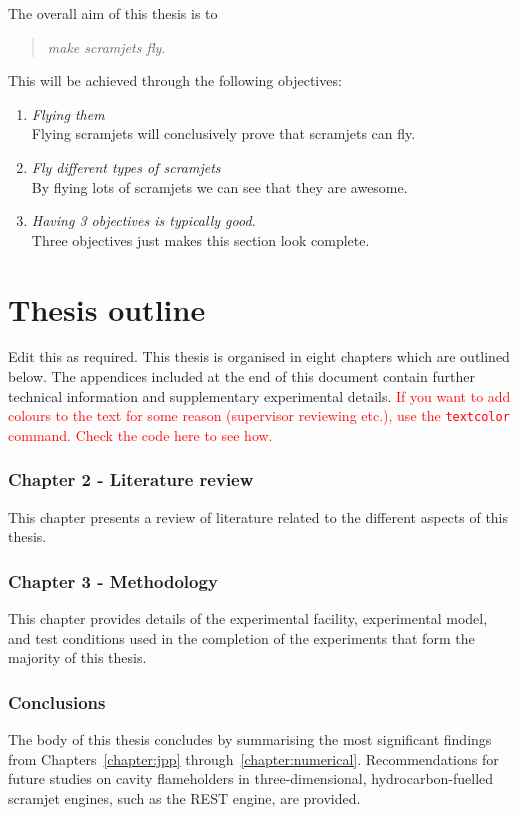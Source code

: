    The overall aim of this thesis is to

    \begin{quote}
      \emph{make scramjets fly}.
    \end{quote}

    \noindent This will be achieved through the following objectives:

    \begin{enumerate}
      \item \emph{Flying them}\\
      Flying scramjets will conclusively prove that scramjets can fly.

      \item \emph{Fly different types of scramjets}\\
      By flying lots of scramjets we can see that they are awesome. 

      \item \emph{Having 3 objectives is typically good.}\\
      Three objectives just makes this section look complete.
    \end{enumerate}

  \clearpage
  \section{Thesis outline}

    Edit this as required. This thesis is organised in eight chapters which are outlined below. The appendices included at the end of this document contain further technical information and supplementary experimental details. \textcolor{red}{If you want to add colours to the text for some reason (supervisor reviewing etc.), use the \texttt{textcolor} command. Check the code here to see how.}

    \subsubsection*{Chapter 2 - Literature review}

      This chapter presents a review of literature related to the different aspects of this thesis. 

    \subsubsection*{Chapter 3 - Methodology}

      This chapter provides details of the experimental facility, experimental model, and test conditions used in the completion of the experiments that form the majority of this thesis. 

    \subsubsection*{Conclusions}

      The body of this thesis concludes by summarising the most significant findings from Chapters~\ref{chapter:jpp} through~\ref{chapter:numerical}. Recommendations for future studies on cavity flameholders in three-dimensional, hydrocarbon-fuelled scramjet engines, such as the REST engine, are provided.
